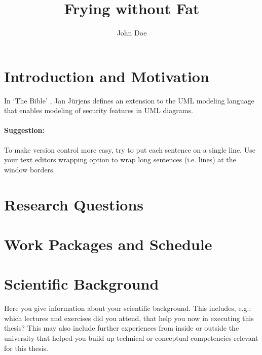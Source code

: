 \documentclass[master,proposal,extern,palatino]{rgseThesis}
\author{John Doe}
\title{Frying without Fat}
\begin{document}

    \maketitle

    \tableofcontents


    \section{Introduction and Motivation}

    In `The Bible' \cite{Juerjens2005SSD}, Jan Jürjens defines an extension to the UML modeling language that enables modeling of security features in UML diagrams.

    \paragraph{Suggestion:}
    To make version control more easy, try to put each sentence on a single line.
    Use your text editors wrapping option to wrap long sentences (i.e. lines) at the window borders.

    \section{Research Questions}

    \lipsum[1-2]

    \section{Work Packages and Schedule}

    \lipsum[3-4]

    \section{Scientific Background}

    Here you give information about your scientific background.
    This includes, e.g.: which lectures and exercises did you attend, that help you now in executing this thesis?
    This may also include further experiences from inside or outside the university that helped you build up technical or conceptual competencies relevant for this thesis.

    \lipsum[5]

    \printbibliography[heading=bibintoc]
\end{document}

